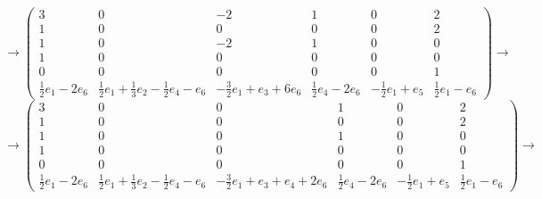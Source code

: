 \documentclass[12pt]{article}
\begin{document}
    \[
        \rightarrow
        \begin{pmatrix}
            3                       & 0                                                        & -2                            & 1                       & 0                      & 2                     \\
            1                       & 0                                                        & 0                             & 0                       & 0                      & 2                     \\
            1                       & 0                                                        & -2                            & 1                       & 0                      & 0                     \\
            1                       & 0                                                        & 0                             & 0                       & 0                      & 0                     \\
            0                       & 0                                                        & 0                             & 0                       & 0                      & 1                     \\
            \frac{1}{2} e_1 - 2 e_6 & \frac{1}{2}e_1 + \frac{1}{3} e_2 - \frac{1}{2} e_4 - e_6 & -\frac{3}{2}e_1 + e_3 + 6 e_6  & \frac{1}{2} e_4 - 2 e_6 & -\frac{1}{2} e_1 + e_5 & \frac{1}{2} e_1 - e_6
        \end{pmatrix}
        \rightarrow
    \]
    \[
        \rightarrow
        \begin{pmatrix}
            3                       & 0                                                        & 0                                   & 1                       & 0                      & 2                     \\
            1                       & 0                                                        & 0                                   & 0                       & 0                      & 2                     \\
            1                       & 0                                                        & 0                                   & 1                       & 0                      & 0                     \\
            1                       & 0                                                        & 0                                   & 0                       & 0                      & 0                     \\
            0                       & 0                                                        & 0                                   & 0                       & 0                      & 1                     \\
            \frac{1}{2} e_1 - 2 e_6 & \frac{1}{2}e_1 + \frac{1}{3} e_2 - \frac{1}{2} e_4 - e_6 & -\frac{3}{2}e_1 + e_3 + e_4 + 2 e_6  & \frac{1}{2} e_4 - 2 e_6 & -\frac{1}{2} e_1 + e_5 & \frac{1}{2} e_1 - e_6
        \end{pmatrix}
        \rightarrow
    \]
\end{document}
